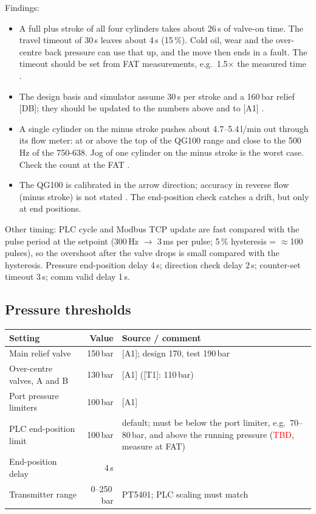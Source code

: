 \documentclass[11pt,a4paper]{article}
\newcommand{\TBD}{\textcolor{red}{TBD}}
\begin{document}
Findings:
\begin{itemize}[nosep]
  \item A full plus stroke of all four cylinders takes about 26\,s of valve-on time. The travel
        timeout of 30\,s leaves about 4\,s (15\,\%). Cold oil, wear and the over-centre back pressure
        can use that up, and the move then ends in a fault. The timeout should be set from FAT
        measurements, e.g.\ 1.5$\times$ the measured time .
  \item The design basis and simulator assume 30\,s per stroke and a 160\,bar relief [DB]; they
        should be updated to the numbers above and to [A1] .
  \item A single cylinder on the minus stroke pushes about 4.7--5.4\,l/min out through its flow
        meter: at or above the top of the QG100 range and close to the 500\,Hz of the 750-638. Jog
        of one cylinder on the minus stroke is the worst case. Check the count at the FAT .
  \item The QG100 is calibrated in the arrow direction; accuracy in reverse flow (minus stroke) is
        not stated . The end-position check catches a drift, but only at end positions.
\end{itemize}

Other timing: PLC cycle and Modbus TCP update are fast compared with the pulse period at the
setpoint (300\,Hz $\to$ 3\,ms per pulse; 5\,\% hysteresis = $\approx$100 pulses), so the overshoot
after the valve drops is small compared with the hysteresis. Pressure end-position delay 4\,s;
direction check delay 2\,s; counter-set timeout 3\,s; comm valid delay 1\,s.

\subsection{Pressure thresholds}
\begin{small}
\begin{tabularx}{\textwidth}{@{}LrP{60mm}@{}}
\toprule
Setting & Value & Source / comment \\
\midrule
Main relief valve & 150\,bar & [A1]; design 170, test 190\,bar \\
Over-centre valves, A and B & 130\,bar & [A1] ([T1]: 110\,bar) \\
Port pressure limiters & 100\,bar & [A1] \\
PLC end-position limit  & 100\,bar &  default; must be below the port limiter, e.g.\ 70--80\,bar, and above the running pressure (\TBD, measure at FAT)  \\
End-position delay & 4\,s &  \\
Transmitter range & 0--250\,bar & PT5401; PLC scaling must match  \\
\bottomrule
\end{tabularx}
\end{small}
\end{document}
